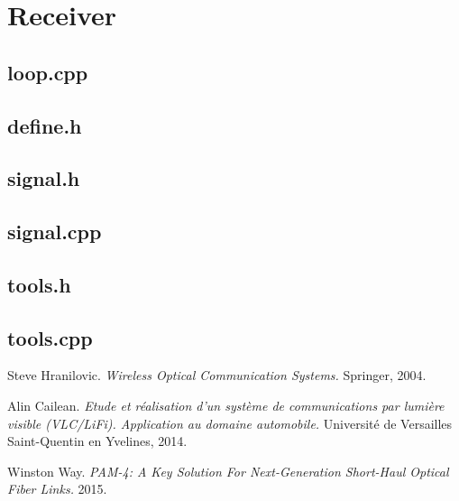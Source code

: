 \documentclass[12pt]{report}
\begin{document}


\section{Receiver}

\subsection{loop.cpp}



\subsection{define.h}



\subsection{signal.h}



\subsection{signal.cpp}



\subsection{tools.h}



\subsection{tools.cpp}





\begin{thebibliography}{9}

Steve Hranilovic.
\textit{Wireless Optical Communication Systems.}
Springer, 2004.

Alin Cailean.
\textit{Etude et réalisation d’un système de communications par lumière visible (VLC/LiFi). Application au domaine automobile.}
Université de Versailles Saint-Quentin en Yvelines, 2014.

Winston Way.
\textit{PAM-4: A Key Solution For Next-Generation Short-Haul Optical Fiber Links.}
2015.

\end{thebibliography}
\end{document}
